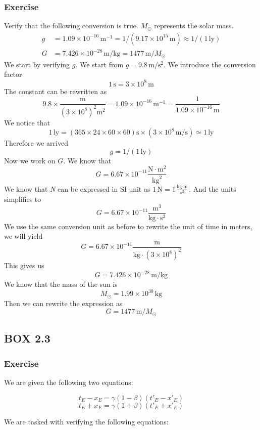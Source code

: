 \documentclass[12pt]{article}
\newcommand{\paren}[1]{\left( #1 \right)}
\begin{document}
\subsubsection{Exercise}
Verify that the following conversion is true. $M_\odot$ represents the solar mass.
\begin{align*}
g &= 1.09 \times 10^{-16} \, \text{m}^{-1} = 1 / (9.17 \times 10^{15} \, \text{m}) \approx 1 / (1 \, \text{ly})\\
G &= 7.426 \times 10^{-28} \, \text{m/kg} = 1477 \, \text{m} / M_\odot
\end{align*}
We start by verifying $g$. We start from $g = 9.8 \,\text{m/s$^2$}$. We introduce the conversion factor
\[
1\, \text{s} = 3\times 10^{8} \,\text{m}
\]
The constant can be rewritten as
\[
9.8 \times \frac{\text{m}}{\paren{3\times 10^{8}}^2\text{m}^2} =  1.09 \times 10^{-16} \, \text{m}^{-1} = \frac{1}{1.09 \times 10^{-16}\,\text{m}}
\]
We notice that
\[
1\,\text{ly} = \paren{365\times 24\times 60\times 60}\text{s} \times \paren{3\times 10^{8} \,\text{m/s}} \simeq 1\,\text{ly}
\]
Therefore we arrived 
\[
g = 1 / (1 \, \text{ly})
\]
Now we work on $G$. We know that 
\[
G = 6.67 \times 10^{-11} \frac{\text{N}\cdot\text{m}^2}{\text{kg}^2}
\]
We know that \textit{N} can be expressed in SI unit as $1\,$N$= 1\frac{\text{kg}\cdot\text{m}}{\text{s}^2}$. And the units simplifies to
\[
G = 6.67 \times 10^{-11} \frac{\text{m}^3}{\text{kg}\cdot \text{s}^2}
\]
We use the same conversion unit as before to rewrite the unit of time in meters, we will yield
\[
G = 6.67 \times 10^{-11} \frac{\text{m}}{\text{kg}\cdot \paren{3\times 10^{8}}^2}
\]
This gives us
\[
G = 7.426 \times 10^{-28}\, \text{m/kg}
\]
We know that the mass of the sun is
\[
M_\odot = 1.99 \times 10^{30}\,\text{kg}
\]
Then we can rewrite the expression as
\[
G = 1477 \, \text{m} / M_\odot
\]



\subsection{BOX 2.3}
    \subsubsection{Exercise}
    We are given the following two equations:

\[
t_E - x_E = \gamma (1 - \beta)(t'_E - x'_E) \tag{2.13a}
\]
\[
t_E + x_E = \gamma (1 + \beta)(t'_E + x'_E) \tag{2.13b}
\]

We are tasked with verifying the following equations:
\end{document}
